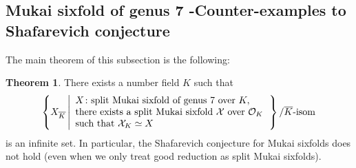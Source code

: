 \documentclass[autodetect-engine, a4paper]{amsart}
\theoremstyle{definition}
\newtheorem{thm}{Theorem}[section]
\def\cO{\mathcal{O}}
\begin{document}
\subsection{Mukai sixfold of genus 7
-Counter-examples to Shafarevich conjecture}


The main theorem of this subsection is the following:


\begin{thm}
\label{thm:counterexampleshaf}
There exists a number field $K$ such that 
\[
\left\{X_{\overline{K}}  \left|
\begin{array}{l}
X \colon \textup{split Mukai sixfold of genus 7 over } K,\\
\textup{there exists a split Mukai sixfold }\mathcal{X} \textup{ over } \cO_{K} \\
\textup{such that } \mathcal{X}_{K} \simeq X
\end{array}
\right.
\right\}/\overline{K}\textup{-isom}
\]
is an infinite set.
In particular, the Shafarevich conjecture  for Mukai sixfolds does not hold (even when we only treat good reduction as split Mukai sixfolds).
\end{thm}
\end{document}
